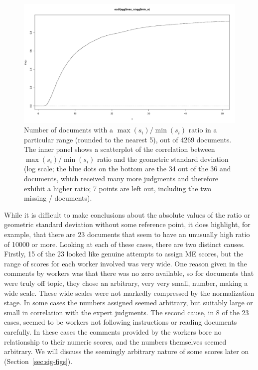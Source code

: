 \begin{figure}[tp]
  \centering
  \includegraphics[width=.9\linewidth,page=6]{figs/JudgeVariability.pdf}
  \caption{Number of documents with a $\max(s_i) / \min(s_i)$ ratio in
    a particular range (rounded to the nearest 5), out of 4269 documents.  
    The inner panel shows a scatterplot of the correlation
    between
    $\max(s_i) / \min(s_i)$ ratio and the geometric standard deviation
    (log scale;  the blue dots on the bottom are
    the 34 out of the 36 \nkn and \hkh documents, which received many
    more judgments and therefore exhibit a higher ratio; 7 points are
    left out, including the two missing  \nkn / \hkh documents). 
    \label{fig:judgeVariability}
  }
\end{figure}

While it is difficult to make conclusions about the absolute values of
the ratio or geometric standard deviation without some reference point, it does highlight, for
example, that there are 23 documents that seem to have an
unusually high ratio of 10000 or more.
Looking at each of these cases, there are two distinct causes.
Firstly, 15 of the 23 looked like genuine attempts to assign ME scores,
but the range of scores for each worker involved was very wide.
One reason given in the comments by workers was that there was no zero
available, so for documents that were truly off topic, they chose an
arbitrary, very very small, number, making a wide scale.
These wide scales were not markedly compressed by the normalization
stage.
In some cases the numbers assigned seemed arbitrary, but suitably
large or small in correlation with the expert judgments.
The second cause, in 8 of the 23 cases, seemed to be workers not
following instructions or reading documents carefully.
In these cases the comments provided by the workers bore no
relationship to their numeric scores, and the numbers themselves
seemed arbitrary.
We will discuss the seemingly arbitrary nature of some scores later on
(Section~\ref{sec:sig-figs}). 

